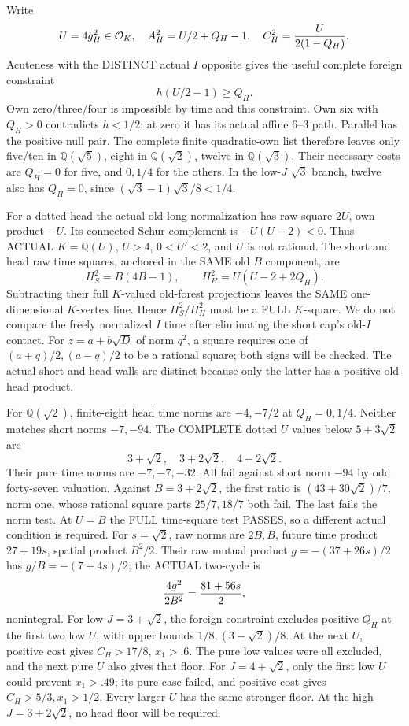 Write
\[
 U=4g_H^2\in\mathcal O_K,\quad
 A_H^2=U/2+Q_H-1,\quad
 C_H^2={U\over2(1-Q_H)} .
\]
Acuteness with the DISTINCT actual \(I\)
opposite gives the useful complete foreign
constraint
\[
                             h(U/2-1)\ge Q_H .
\]
Own zero/three/four is impossible by time
and this constraint.
Own six with \(Q_H>0\) contradicts
\(h<1/2\); at zero it has its actual
affine \(6\)--\(3\) path.
Parallel has the positive null pair.
The complete finite quadratic-own list
therefore leaves only five/ten in
\(\mathbb Q(\sqrt5)\), eight in
\(\mathbb Q(\sqrt2)\), twelve in
\(\mathbb Q(\sqrt3)\).
Their necessary costs are \(Q_H=0\)
for five, and \(0,1/4\) for the others.
In the low-\(J\) \(\sqrt3\) branch,
twelve also has \(Q_H=0\), since
\((\sqrt3-1)\sqrt3/8<1/4\).

For a dotted head the actual
old-long normalization has raw square
\(2U\), own product \(-U\).
Its connected Schur complement is
\(-U(U-2)<0\).
Thus ACTUAL \(K=\mathbb Q(U)\),
\(U>4\), \(0<U'<2\), and \(U\) is
not rational.
The short and head raw time squares,
anchored in the SAME old \(B\) component,
are
\[
                        H_S^2=B(4B-1),\qquad
                        H_H^2=U(U-2+2Q_H).
\]
Subtracting their full \(K\)-valued
old-forest projections leaves the SAME
one-dimensional \(K\)-vertex line.
Hence \(H_S^2/H_H^2\) must be a FULL
\(K\)-square.
We do not compare the freely normalized
\(I\) time after eliminating the short
cap's old-\(I\) contact.
For \(z=a+b\sqrt D\) of norm \(q^2\),
a square requires one of
\((a+q)/2,(a-q)/2\) to be a rational
square; both signs will be checked.
The actual short and head walls are
distinct because only the latter has
a positive old-head product.

For \(\mathbb Q(\sqrt2)\), finite-eight
head time norms are \(-4,-7/2\)
at \(Q_H=0,1/4\).
Neither matches short norms \(-7,-94\).
The COMPLETE dotted \(U\) values below
\(5+3\sqrt2\) are
\[
                         3+\sqrt2,\quad3+2\sqrt2,\quad4+2\sqrt2 .
\]
Their pure time norms are \(-7,-7,-32\).
All fail against short norm \(-94\)
by odd forty-seven valuation.
Against \(B=3+2\sqrt2\), the first
ratio is \((43+30\sqrt2)/7\),
norm one, whose rational square parts
\(25/7,18/7\) both fail.
The last fails the norm test.
At \(U=B\) the FULL time-square test
PASSES, so a different actual condition
is required.
For \(s=\sqrt2\), raw norms are \(2B,B\),
future time product \(27+19s\), spatial
product \(B^2/2\).
Their raw mutual product \(g=-(37+26s)/2\)
has \(g/B=-(7+4s)/2\); the ACTUAL
two-cycle is
\[
                          {4g^2\over2B^2}={81+56s\over2},
\]
nonintegral.
For low \(J=3+\sqrt2\), the foreign
constraint excludes positive \(Q_H\)
at the first two low \(U\), with upper
bounds \(1/8,(3-\sqrt2)/8\).
At the next \(U\), positive cost gives
\(C_H>17/8\), \(x_1>.6\).
The pure low values were all excluded,
and the next pure \(U\) also gives
that floor.
For \(J=4+\sqrt2\), only the first
low \(U\) could prevent \(x_1>.49\);
its pure case failed, and positive
cost gives \(C_H>5/3,x_1>1/2\).
Every larger \(U\) has the same stronger
floor.
At the high \(J=3+2\sqrt2\), no head
floor will be required.

